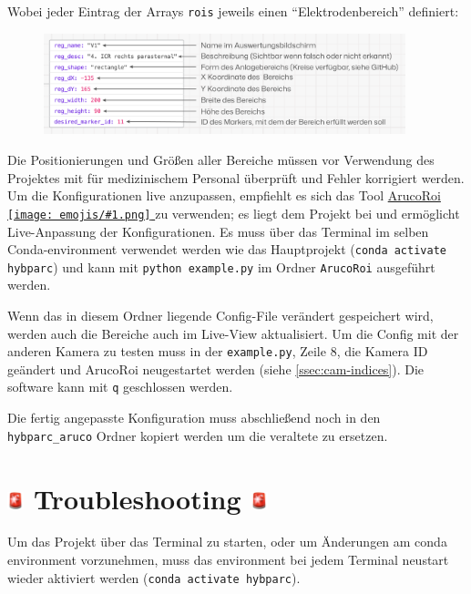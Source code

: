 \documentclass[a4paper, 10pt]{article}
\newcommand{\code}[1]{\texttt{#1}}
\newcommand{\emoji}[1]{
    \begingroup\normalfont
    \texttt{[image: emojis/\#1.png]}
    \endgroup
}
\begin{document}
\noindent Wobei jeder Eintrag der Arrays \code{rois} jeweils einen \enquote{Elektrodenbereich} definiert:
\begin{figure}[H]
    \centering
    \includegraphics[width=10.5cm]{json-explainer.png}
\end{figure}

\noindent Die Positionierungen und Größen aller Bereiche müssen vor Verwendung des Projektes mit für medizinischem Personal überprüft und Fehler korrigiert werden. Um die Konfigurationen live anzupassen, empfiehlt es sich das Tool \href{https://github.com/leloomi/arucoroi}{ArucoRoi\emoji{link}} zu verwenden; es liegt dem Projekt bei und ermöglicht Live-Anpassung der Konfigurationen. Es muss über das Terminal im selben Conda-environment verwendet werden wie das Hauptprojekt (\code{conda activate hybparc}) und kann mit \code{python example.py} im Ordner \code{ArucoRoi} ausgeführt werden. 

Wenn das in diesem Ordner liegende Config-File verändert gespeichert wird, werden auch die Bereiche auch im Live-View aktualisiert. Um die Config mit der anderen Kamera zu testen muss in der \code{example.py}, Zeile 8, die Kamera ID geändert und ArucoRoi neugestartet werden (siehe \ref{ssec:cam-indices}). Die software kann mit \code{q} geschlossen werden.

Die fertig angepasste Konfiguration muss abschließend noch in den \code{hybparc\_aruco} Ordner kopiert werden um die veraltete zu ersetzen.
\section{\includegraphics[height=0.65em]{emojis/police-light.png} Troubleshooting \includegraphics[height=0.65em]{emojis/police-light.png}}
\label{sec:troubleshooting}

Um das Projekt über das Terminal zu starten, oder um Änderungen am conda environment vorzunehmen, muss das environment bei jedem Terminal neustart wieder aktiviert werden (\code{conda activate hybparc}).
\end{document}
